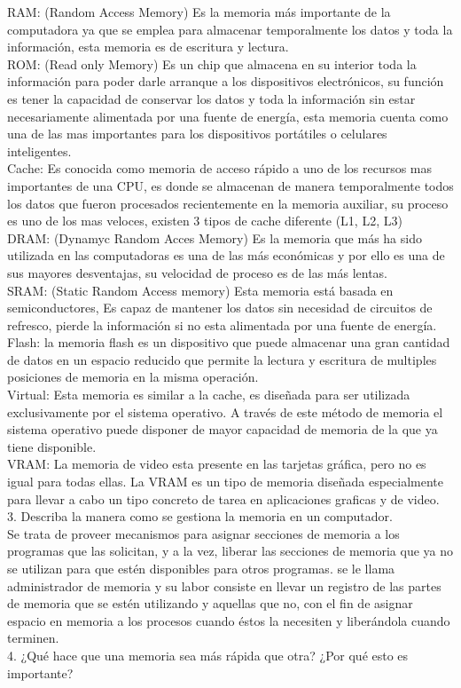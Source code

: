 \documentclass{article}
\begin{document}
RAM: (Random Access Memory) Es la memoria más importante de la computadora ya que se emplea para almacenar temporalmente los datos y toda la información, esta memoria es de escritura y lectura.
\\
ROM: (Read only Memory) Es un chip que almacena en su interior toda la información para poder darle arranque a los dispositivos electrónicos, su función es tener la capacidad de conservar los datos y toda la información sin estar necesariamente alimentada por una fuente de energía, esta memoria cuenta como una de las mas importantes para los dispositivos portátiles o celulares inteligentes.
\\
Cache: Es conocida como memoria de acceso rápido a uno de los recursos mas importantes de una CPU, es donde se almacenan de manera temporalmente todos los datos que fueron procesados recientemente en la memoria auxiliar, su proceso es uno de los mas veloces, existen 3 tipos de cache diferente (L1, L2, L3)
\\
DRAM: (Dynamyc Random Acces Memory) Es la memoria que más ha sido utilizada en las computadoras es una de las más económicas y por ello es una de sus mayores desventajas, su velocidad de proceso es de las más lentas.
\\
SRAM: (Static Random Access memory) Esta memoria está basada en semiconductores, Es capaz de mantener los datos sin necesidad de circuitos de refresco, pierde la información si no esta alimentada por una fuente de energía.
\\
Flash: la memoria flash es un dispositivo que puede almacenar una gran cantidad de datos en un espacio reducido que permite la lectura y escritura de multiples posiciones de memoria en la misma operación.
\\
Virtual: Esta memoria es similar a la cache, es diseñada para ser utilizada exclusivamente por el sistema operativo. A través de este método de memoria el sistema operativo puede disponer de mayor capacidad de memoria de la que ya tiene disponible. 
\\
VRAM: La memoria de video esta presente en las tarjetas gráfica, pero no es igual para todas ellas. La VRAM es un tipo de memoria diseñada especialmente para llevar a cabo un tipo concreto de tarea en aplicaciones graficas y de video.  
\\
3.	Describa la manera como se gestiona la memoria en un computador.
\\
Se trata de proveer mecanismos para asignar secciones de memoria a los programas que las solicitan, y a la vez, liberar las secciones de memoria que ya no se utilizan para que estén disponibles para otros programas. se le llama administrador de memoria y su labor consiste en llevar un registro de las partes de memoria que se estén utilizando y aquellas que no, con el fin de asignar espacio en memoria a los procesos cuando éstos la necesiten y liberándola cuando terminen.  \cite{gestion}
\\
4.	¿Qué hace que una memoria sea más rápida que otra? ¿Por qué esto es importante?
\\
\end{document}
